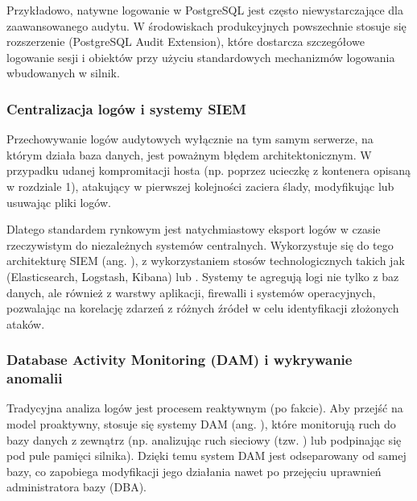 \documentclass[a4paper,11pt,english,openany,oneside]{sphinxmanual}
\begin{document}
\sphinxAtStartPar
Przykładowo, natywne logowanie w PostgreSQL jest często niewystarczające dla zaawansowanego audytu. W środowiskach produkcyjnych powszechnie stosuje się rozszerzenie  (PostgreSQL Audit Extension), które dostarcza szczegółowe logowanie sesji i obiektów przy użyciu standardowych mechanizmów logowania wbudowanych w silnik.


\subsubsection{Centralizacja logów i systemy SIEM}
\label{\detokenize{rozdzial_2/rozdzial_27/rozdzial_5:centralizacja-logow-i-systemy-siem}}
\sphinxAtStartPar
Przechowywanie logów audytowych wyłącznie na tym samym serwerze, na którym działa baza danych, jest poważnym błędem architektonicznym. W przypadku udanej kompromitacji hosta (np. poprzez ucieczkę z kontenera opisaną w rozdziale 1), atakujący w pierwszej kolejności zaciera ślady, modyfikując lub usuwając pliki logów.

\sphinxAtStartPar
Dlatego standardem rynkowym jest natychmiastowy eksport logów w czasie rzeczywistym do niezależnych systemów centralnych. Wykorzystuje się do tego architekturę SIEM (ang. ), z wykorzystaniem stosów technologicznych takich jak  (Elasticsearch, Logstash, Kibana) lub . Systemy te agregują logi nie tylko z baz danych, ale również z warstwy aplikacji, firewalli i systemów operacyjnych, pozwalając na korelację zdarzeń z różnych źródeł w celu identyfikacji złożonych ataków.


\subsubsection{Database Activity Monitoring (DAM) i wykrywanie anomalii}
\label{\detokenize{rozdzial_2/rozdzial_27/rozdzial_5:database-activity-monitoring-dam-i-wykrywanie-anomalii}}
\sphinxAtStartPar
Tradycyjna analiza logów jest procesem reaktywnym (po fakcie). Aby przejść na model proaktywny, stosuje się systemy DAM (ang. ), które monitorują ruch do bazy danych z zewnątrz (np. analizując ruch sieciowy (tzw. ) lub podpinając się pod pule pamięci silnika). Dzięki temu system DAM jest odseparowany od samej bazy, co zapobiega modyfikacji jego działania nawet po przejęciu uprawnień administratora bazy (DBA).
\end{document}
